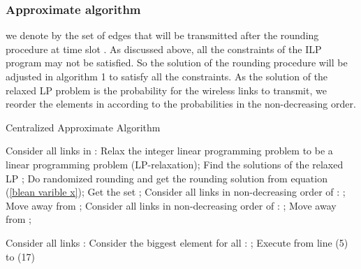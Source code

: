 \documentclass[conference]{IEEEtran}
\begin{document}
\subsubsection{Approximate algorithm}
we denote by  the set of edges
that will be transmitted after the rounding procedure at time slot
. As discussed above, all the constraints of the ILP program may
not be satisfied. So the solution of the rounding procedure will be
adjusted in algorithm 1 to satisfy all the constraints. As the
solution of the relaxed LP problem  is the probability for the wireless links to
transmit, we reorder the elements in  according to the
probabilities in the non-decreasing order.
\begin{algorithm}[!tb]
\caption{Centralized Approximate Algorithm} \label{Centralized
algorithm}
\begin{algorithmic}[1]
\STATE Consider all links in :
\STATE Relax the integer linear programming problem to be a linear programming problem
(LP-relaxation);
\STATE Find the solutions of the relaxed LP
;
\STATE Do randomized rounding and get the rounding solution
 from equation (\ref{blean
varible x});
 \STATE Get the set
;
\STATE Consider all links  in non-decreasing order of
:
\STATE ;
\STATE Move  away from
;
\ENDIF
\STATE Consider all links  in non-decreasing order of :
\STATE ;
\STATE Move  away from
;
\ENDIF
\ENDFOR

\STATE Consider all links :
 \IF{}
\STATE Consider the biggest element  for all :
\STATE ;
\STATE Execute from line (5) to (17)
\ENDIF
\ENDFOR

\end{algorithmic}
\end{algorithm}
\end{document}
